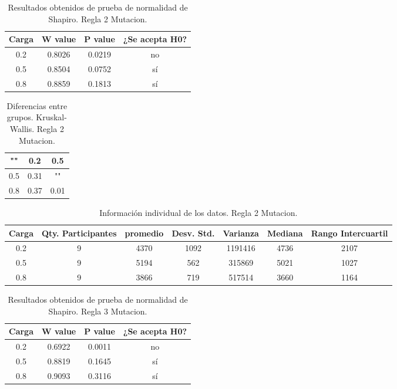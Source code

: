 \documentclass{article}
\begin{document}
\begin{table}[ht]
    \centering
    \caption{Resultados obtenidos de prueba de normalidad de Shapiro. Regla 2 Mutacion.} 
    \begin{tabular}{|c|c|c|c|}
    \hline
    Carga & W value & P value & ¿Se acepta H0?  \\
    \hline
    0.2 & 0.8026 & 0.0219 & no \\
    \hline 
     0.5 & 0.8504 & 0.0752 &  s\'i \\
    \hline 
    0.8 & 0.8859 & 0.1813 & s\'i \\
    \hline 
\end{tabular}
    \label{cuadro 13}
\end{table}

\begin{table}[htb]
    \centering
    \caption{Diferencias entre grupos. Kruskal-Wallis. Regla 2 Mutacion.} 
    \begin{tabular}{|c|c|c|}
    \hline
    "" & 0.2 & 0.5 \\
    \hline
    0.5 & 0.31 & ""  \\
    \hline
    0.8 & 0.37 & 0.01  \\
    \hline
\end{tabular}
    \label{cuadro 14}
\end{table}

\begin{table}[htb]
    \centering
    \caption{Informaci\'on individual de los datos. Regla 2 Mutacion.} 
    \begin{tabular}{|c|c|c|c|c|c|c|}
    \hline
    Carga & Qty. Participantes & promedio & Desv. Std. & Varianza & Mediana & Rango Intercuartil  \\
    \hline
    0.2 & 9 & 4370 & 1092 & 1191416 & 4736 & 2107 \\
    \hline
    0.5 & 9 & 5194 & 562 & 315869 & 5021 & 1027 \\
    \hline
    0.8 & 9 & 3866 & 719 & 517514 & 3660 & 1164 \\
    \hline
\end{tabular}
    \label{cuadro 15}
\end{table}



\begin{table}[ht]
    \centering
    \caption{Resultados obtenidos de prueba de normalidad de Shapiro. Regla 3 Mutacion.} 
    \begin{tabular}{|c|c|c|c|}
    \hline
    Carga & W value & P value & ¿Se acepta H0?  \\
    \hline
    0.2 & 0.6922 & 0.0011 & no \\
    \hline 
     0.5 & 0.8819 & 0.1645 &  s\'i \\
    \hline 
    0.8 & 0.9093 & 0.3116 & s\'i \\
    \hline 
\end{tabular}
    \label{cuadro 16}
\end{table}
\end{document}
